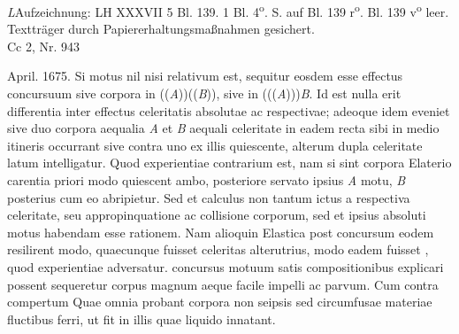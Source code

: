 \begin{Ueberlieferung}%
{\textit{L}}Aufzeichnung: LH XXXVII 5 Bl. 139. 1 Bl. 4\textsuperscript{o}.  S. auf Bl. 139 r\textsuperscript{o}. Bl. 139 v\textsuperscript{o} leer. Texttr\"{a}ger durch Papiererhaltungsma{\ss}nahmen gesichert. \\ Cc 2, Nr. 943
\end{Ueberlieferung}

\count{}
\pstartfirst 
[139~r\textsuperscript{o}] April. 1675.\pend 
\pstart \noindent
Si motus\protect{} nil nisi relativum est, sequitur eosdem esse effectus\protect{} concursuum\protect{} sive corpora\protect{} 
in ((\textit{A}))((\textit{B})), sive in (((\textit{A})))\textit{B}. Id est nulla erit differentia inter effectus celeritatis absolutae\protect{} ac respectivae\protect{}; adeoque idem eveniet sive duo corpora  aequalia \textit{A} et \textit{B} aequali celeritate in eadem recta sibi in medio itineris occurrant sive contra uno ex illis quiescente, alterum dupla celeritate latum intelligatur. Quod experientiae\protect{} contrarium est, nam si sint corpora Elaterio\protect{} carentia priori modo quiescent ambo, posteriore servato ipsius \textit{A} motu, \textit{B} posterius cum eo abripietur. Sed et calculus
non tantum ictus a respectiva celeritate, seu appropinquatione ac collisione corporum, sed et ipsius absoluti motus habendam esse rationem. Nam alioquin Elastica\protect{} post concursum eodem resilirent modo, quaecunque fuisset celeritas alterutrius, modo eadem fuisset , quod experientiae adversatur.  concursus motuum satis compositionibus explicari possent sequeretur corpus magnum aeque facile impelli ac parvum. Cum contra compertum  Quae omnia probant corpora non seipsis sed circumfusae materiae fluctibus ferri, ut fit in illis quae liquido innatant.
